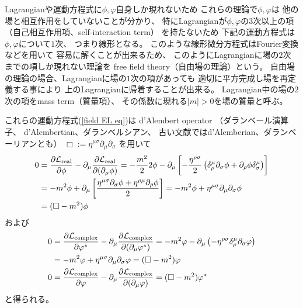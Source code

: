 Lagrangianや運動方程式に$\phi, \varphi$自身しか現れないため
これらの理論で$\phi, \varphi$は
他の場と相互作用をしていないことが分かり、
特にLagrangianが$\phi, \varphi$の$3$次以上の項
（自己相互作用項、self-interaction term）
を持たないため
下記の運動方程式は$\phi, \varphi$について$1$次、
つまり線形となる。
このような線形微分方程式はFourier変換などを用いて
容易に解くことが出来るため、
このようにLagrangianに場の$2$次までの項しか現れない理論を
free field theory（自由場の理論）という。
自由場の理論の場合、Lagrangianに場の$1$次の項があっても
適切に平方完成し場を再定義する事により
上のLagrangianに帰着することが出来る。
Lagrangian中の場の$2$次の項をmass term（質量項）、
その係数に現れる$|m| > 0$を場の質量と呼ぶ。

これらの運動方程式(\ref{field EL eq})は
d'Alembert operator
（ダランベール演算子、
d'Alembertian、ダランベルシアン、
古い文献ではd'Alemberian、ダランベーリアンとも）
$\Box := \eta^{\mu \sigma}
    \partial_\mu
    \partial_\sigma$
を用いて
\begin{align}
    0 &=
    \dfrac{\partial \mathcal{L}_{\rm real}}
        {\partial \phi}
    -
    \partial_\mu
    \dfrac{\partial \mathcal{L}_{\rm real}}
        {\partial (\partial_\mu \phi)}
    =
    - \dfrac{m^2}{2}2 \phi
    -
    \partial_\mu
    \left[
        -
        \dfrac{ \eta^{\rho \sigma} }{2}
        \left(
            \delta_\rho^\mu
            \partial_\sigma \phi
        +
            \partial_\rho \phi
            \delta_\sigma^\mu
        \right)
    \right]
\notag\\&
    =
    - m^2 \phi
    +
    \partial_\mu
    \left[
        \dfrac{
            \eta^{\mu \sigma}
            \partial_\sigma \phi
        +
            \eta^{\rho \mu}
            \partial_\rho \phi
        }{2}
    \right]
    =
    - m^2 \phi
    +
    \eta^{\mu \sigma}
        \partial_\mu
        \partial_\sigma
    \phi
\notag\\&
    =
    (\Box - m^2) \phi
\label{free real scalar eom}
\end{align}
および
\begin{subequations}
\begin{align}
    0 &=
    \dfrac{\partial \mathcal{L}_{\rm complex}}
        {\partial \varphi^*}
    -
    \partial_\mu
    \dfrac{\partial \mathcal{L}_{\rm complex}}
        {\partial (\partial_\mu \varphi^*)}
    =
    -
    m^2 \varphi
    -
    \partial_\mu
    \left(
        -
        \eta^{\rho\sigma}
        \delta_\rho^\mu
        \partial_\sigma \varphi        
    \right)
\notag\\&
    =
    -
    m^2 \varphi
    +
    \eta^{\mu\sigma}
        \partial_\mu
        \partial_\sigma
        \varphi
    =
    (\Box - m^2)
    \varphi
\\
    0 &=
    \dfrac{\partial \mathcal{L}_{\rm complex}}
        {\partial \varphi}
    -
    \partial_\mu
    \dfrac{\partial \mathcal{L}_{\rm complex}}
        {\partial (\partial_\mu \varphi)}
    =
    (\Box - m^2)
    \varphi^*
\end{align}
\label{free complex scalar eom}
\end{subequations}
と得られる。

